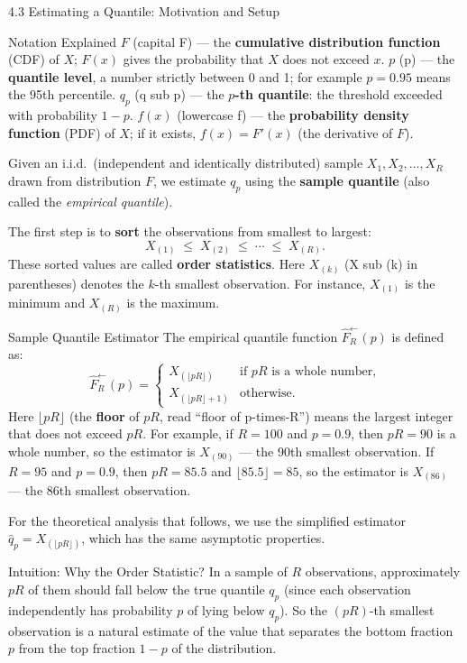 \documentclass[aspectratio=169,10pt]{beamer}
\begin{document}
\begin{frame}[allowframebreaks]{4.3 Estimating a Quantile: Motivation and Setup}
\begin{block}{Notation Explained}
  $F$ (capital F) --- the \textbf{cumulative distribution function} (CDF) of $X$;
  $F(x)$ gives the probability that $X$ does not exceed $x$.
  $p$ (p) --- the \textbf{quantile level}, a number strictly between 0 and 1;
  for example $p = 0.95$ means the 95th percentile.
  $q_p$ (q sub p) --- the \textbf{$p$-th quantile}: the threshold exceeded with
  probability $1-p$.
  $f(x)$ (lowercase f) --- the \textbf{probability density function} (PDF) of $X$;
  if it exists, $f(x) = F'(x)$ (the derivative of $F$).
\end{block}

\framebreak

Given an i.i.d.\ (independent and identically distributed) sample
$X_1, X_2, \ldots, X_R$ drawn from distribution $F$, we estimate $q_p$ using
the \textbf{sample quantile} (also called the \emph{empirical quantile}).

The first step is to \textbf{sort} the observations from smallest to largest:
\[
  X_{(1)} \;\leq\; X_{(2)} \;\leq\; \cdots \;\leq\; X_{(R)}.
\]
These sorted values are called \textbf{order statistics}.  Here $X_{(k)}$
(X sub (k) in parentheses) denotes the $k$-th smallest observation.
For instance, $X_{(1)}$ is the minimum and $X_{(R)}$ is the maximum.

\begin{block}{Sample Quantile Estimator}
  The empirical quantile function $\hat{F}_R^{\leftarrow}(p)$ is defined as:
  \[
    \hat{F}_R^{\leftarrow}(p) = \begin{cases}
      X_{(\lfloor pR \rfloor)} & \text{if } pR \text{ is a whole number,} \\
      X_{(\lfloor pR \rfloor + 1)} & \text{otherwise.}
    \end{cases}
  \]
  Here $\lfloor pR \rfloor$ (the \textbf{floor} of $pR$, read ``floor of p-times-R'')
  means the largest integer that does not exceed $pR$.  For example, if $R = 100$
  and $p = 0.9$, then $pR = 90$ is a whole number, so the estimator is $X_{(90)}$
  --- the 90th smallest observation.  If $R = 95$ and $p = 0.9$, then $pR = 85.5$
  and $\lfloor 85.5 \rfloor = 85$, so the estimator is $X_{(86)}$ --- the 86th
  smallest observation.
\end{block}

For the theoretical analysis that follows, we use the simplified estimator
$\hat{q}_p = X_{(\lfloor pR \rfloor)}$, which has the same asymptotic properties.

\begin{alertblock}{Intuition: Why the Order Statistic?}
  In a sample of $R$ observations, approximately $pR$ of them should fall below
  the true quantile $q_p$ (since each observation independently has probability $p$
  of lying below $q_p$).  So the $(pR)$-th smallest observation is a natural
  estimate of the value that separates the bottom fraction $p$ from the top
  fraction $1-p$ of the distribution.
\end{alertblock}

\end{frame}
\end{document}
